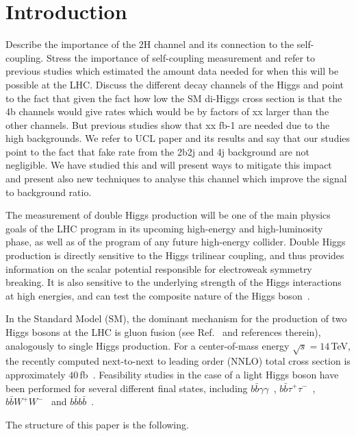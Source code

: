 \section{Introduction}

Describe the importance of the 2H channel and its connection to the self-coupling.
Stress the importance of self-coupling measurement and refer to previous studies which estimated the amount data needed for when this will be possible at the LHC.
Discuss the different decay channels of the Higgs and point to the fact that given the fact how low the SM di-Higgs cross section is that the 4b channels would give rates which would be by factors of xx larger than the other channels.
But previous studies show that xx fb-1 are needed due to the high backgrounds.
We refer to UCL paper and its results and say that our studies point to the fact that fake rate from the 2b2j and 4j background are not negligible. We have studied this and will present ways to mitigate this impact and present also new techniques to analyse this channel which improve the signal to background ratio.



The measurement of double Higgs production will be one of the main
physics goals of the LHC program in its upcoming high-energy and high-luminosity phase, as
well as of the program of any future high-energy collider.
%
Double Higgs production is directly sensitive to the Higgs trilinear coupling, and thus 
provides information on the scalar potential responsible for electroweak symmetry breaking.
It is also sensitive to the underlying strength of the Higgs interactions
at high energies, and can test the composite nature of the 
Higgs boson~\cite{Giudice:2007fh,Contino:2010mh}.


In the Standard Model (SM), the dominant mechanism for the production of two Higgs bosons at the LHC is 
gluon fusion (see Ref.~\cite{baglio} and references therein), analogously to single Higgs production.
For a center-of-mass energy $\sqrt{s} = 14\,$TeV, the recently computed next-to-next to leading order (NNLO)
total cross section is approximately $40\,$fb~\cite{deFlorian:2013jea}.
%
Feasibility studies in the case of a light Higgs boson have been performed for several different final states, including
$b\bar b\gamma\gamma$~\cite{Baur:2003gp,Barger:2013jfa},
$b\bar{b}\tau^+\tau^-$~\cite{Baur:2003gpa,Barr:2013tda,Dolan:2012rv,Dolan:2013rja},
$b\bar{b}W^+W^-$~\cite{Dolan:2012rv,Papaefstathiou:2012qe} and
$b\bar{b}b\bar{b}$~\cite{Baur:2003gpa,Dolan:2012rv,Gouzevitch:2013qca,Cooper:2013kia,Wardrope:2014kya,deLima:2014dta}.
%


The structure of this paper is the following.
